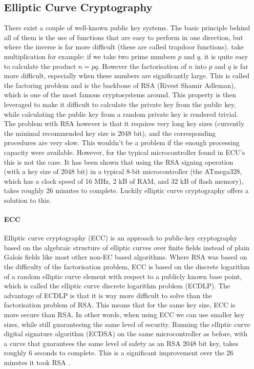 \subsection{Elliptic Curve Cryptography}
\label{subsec:ECC}

There exist a couple of well-known public key systems. The basic principle behind all of them is the use of functions that are easy to perform in one direction, but where the inverse is far more difficult (these are called trapdoor functions). take multiplication for example: if we take two prime numbers $p$ and $q$, it is quite easy to calculate the product $ n=pq $. However the factorisation of $n$ into $p$ and $q$ is far more difficult, especially when these numbers are significantly large. This is called the factoring problem and is the backbone of RSA (Rivest Shamir Adleman), which is one of the most famous cryptosystems around. This property is then leveraged to make it difficult to calculate the private key from the public key, while calculating the public key from a random private key is rendered trivial. The problem with RSA however is that it requires very long key sizes (currently the minimal recommended key size is 2048 bit)\cite{wiki:RSA}, and the corresponding procedures are very slow. This wouldn't be a problem if the enough processing capacity were available. However, for the typical microcontroller found in ECU's this is not the case. It has been shown that using the RSA signing operation (with a key size of 2048 bit) in a typical 8-bit microcontroller (the ATmega328, which has a clock speed of 16 MHz, 2 kB of RAM, and 32 kB of flash memory), takes roughly 26 minutes to complete\cite{Sethi}. Luckily elliptic curve cryptography offers a solution to this.

\paragraph{ECC} Elliptic curve cryptography (ECC) is an approach to public-key cryptography based on the algebraic structure of elliptic curves over finite fields instead of plain Galois fields like most other non-EC based algorithms. Where RSA was based on the difficulty of the factorisation problem, ECC  is based on the discrete logarithm of a random elliptic curve element with respect to a publicly known base point, which is called the elliptic curve discrete logarithm problem (ECDLP)\cite{wiki:ECC}. The advantage of ECDLP is that it is way more difficult to solve than the factorisation problem of RSA. This means that for the same key size, ECC is more secure than RSA. In other words, when using ECC we can use smaller key sizes, while still guaranteeing the same level of security.  Running the elliptic curve digital signature algorithm (ECDSA) on the same microcontroller as before, with a curve that guarantees the same level of safety as an RSA 2048 bit key, takes roughly 6 seconds to complete. This is a significant improvement over the 26 minutes it took RSA \cite{Sethi}.

